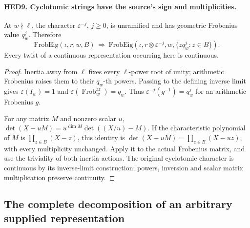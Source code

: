 \documentclass[11pt,a4paper]{article}
\numberwithin{equation}{section}
\theoremstyle{remark}\newtheorem{remark}[theorem]{Remark}
\begin{document}
\paragraph{HED9. Cyclotomic strings have the source's sign and multiplicities.}
\label{claim:HED9}
At \(w\nmid\ell\), the character \(\varepsilon^{-j}\),
\(j\geq0\), is unramified and has geometric Frobenius value
\(q_w^j\).  Therefore
\[
 \mathrm{FrobEig}(\iota,r,w,B)
 \ \Longrightarrow\
 \mathrm{FrobEig}(\iota,r\otimes\varepsilon^{-j},w,
                                     \{zq_w^j:z\in B\}).
 \tag{HED.7}
\]
Every twist of a continuous representation occurring here is continuous.
\begin{proof}
Inertia away from \(\ell\) fixes every \(\ell\)-power root of
unity; arithmetic Frobenius raises them to their \(q_w\)-th powers.
Passing to the defining inverse limit gives
\(\varepsilon(I_w)=1\) and
\(\varepsilon(\operatorname{Frob}^{\mathrm{ar}}_w)=q_w\).
Thus \(\varepsilon^{-j}(g^{-1})=q_w^j\) for an arithmetic
Frobenius \(g\).

For any matrix \(M\) and nonzero scalar \(u\),
\(\det(X-uM)=u^{\dim M}\det((X/u)-M)\).  If the characteristic
polynomial of \(M\) is \(\prod_{z\in B}(X-z)\), this identity
is \(\det(X-uM)=\prod_{z\in B}(X-uz)\), with every multiplicity
unchanged.  Apply it to the actual Frobenius matrix, and use the
triviality of both inertia actions.  The original cyclotomic
character is continuous by its inverse-limit construction; powers,
inversion and scalar matrix multiplication preserve continuity.
\end{proof}

\subsection{The complete decomposition of an arbitrary supplied representation}

\end{document}
